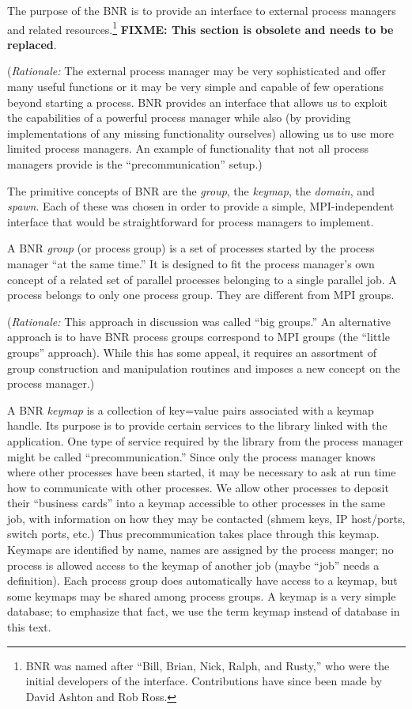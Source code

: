 \documentclass{article}
\def\fixme#1{\marginpar{FIXME:}\textbf{FIXME: #1}}
\begin{document}
The purpose of the BNR is to provide an interface to external process
managers and related resources.\footnote{BNR was named after ``Bill,
Brian, Nick, Ralph, and Rusty,'' who were the initial developers of
the interface.  Contributions have since been made by David Ashton and
Rob Ross.}  \fixme{This section is obsolete and needs to be replaced}.

({\em Rationale:\/} The external process manager may be
very sophisticated and offer many useful functions or it may be very
simple and capable of few operations beyond starting a process.
BNR provides an interface that allows us to exploit the
capabilities of a powerful process manager while also (by providing
implementations of any missing functionality ourselves) allowing us to
use more limited process managers.  An example of functionality that
not all process managers provide is the ``precommunication'' setup.)

The primitive concepts of BNR are the {\em group}, the {\em keymap}, 
the {\em domain}, and {\em spawn}.  Each of these was chosen in 
order to provide a simple, MPI-independent interface that would be 
straightforward for process managers to implement.

A BNR {\em group\/} (or process group) is a set of processes started by the
process manager ``at the same time.''  It is designed to fit the process
manager's own concept of a related set of parallel processes belonging to a
single parallel job.  A process belongs to only one process group.  They are 
different from MPI groups.

({\em Rationale:\/}  This approach in discussion was called ``big groups.''
An alternative approach is to have BNR process groups correspond to MPI groups
(the ``little groups'' approach).  While this has some appeal, it requires an
assortment of group construction and manipulation routines and imposes a new
concept on the process manager.)

A BNR {\em keymap\/} is a collection of key=value pairs associated
with a keymap handle.  Its purpose is to provide certain
services to the library linked with the application.  One type of
service required by the library from the process manager might be
called ``precommunication.''  Since only the process manager knows
where other processes have been started, it may be necessary to ask at
run time how to communicate with other processes.  We allow other
processes to deposit their ``business cards'' into a keymap accessible
to other processes in the same job, with information on how they may
be contacted (shmem keys, IP host/ports, switch ports, etc.)  Thus
precommunication takes place through this keymap.  Keymaps are
identified by name, names are assigned by the process manger; no
process is allowed access to the keymap of another job (maybe ``job''
needs a definition).  Each process group does automatically have
access to a keymap, but some keymaps may be shared among process
groups.  A keymap is a very simple database; to emphasize that fact,
we use the term keymap instead of database in this text.
\end{document}

